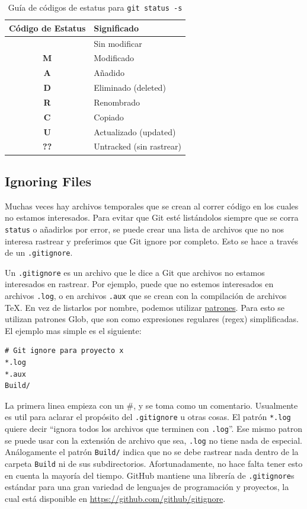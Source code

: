 \documentclass[spanish, 12pt, a4paper]{article}
\begin{document}
\begin{table}[h]
  \centering
  \begin{tabular}{|c|l|}
    \hline
    Código de Estatus & Significado \\
    \hline \hline
      & Sin modificar \\
    \hline
    \textbf{M} & Modificado \\
    \hline
    \textbf{A} & Añadido \\
    \hline
    \textbf{D} & Eliminado (deleted) \\
    \hline
    \textbf{R} & Renombrado \\
    \hline
    \textbf{C} & Copiado \\
    \hline
    \textbf{U} & Actualizado (updated)\\
    \hline
    \textbf{??} & Untracked (sin rastrear) \\
    \hline
  \end{tabular}
  \caption{Guía de códigos de estatus para \texttt{git status -s}}
\end{table}

\subsection{Ignoring Files}
Muchas veces hay archivos temporales que se crean al correr código en los cuales no estamos interesados.
Para evitar que Git esté listándolos siempre que se corra \texttt{status} o añadirlos por error, se puede crear una lista de archivos que no nos interesa rastrear y preferimos que Git ignore por completo.
Esto se hace a través de un \texttt{.gitignore}.

Un \texttt{.gitignore} es un archivo que le dice a Git que archivos no estamos interesados en rastrear.
Por ejemplo, puede que no estemos interesados en archivos \texttt{.log}, o en archivos \texttt{.aux} que se crean con la compilación de archivos \TeX.
En vez de listarlos por nombre, podemos utilizar \underline{patrones}.
Para esto se utilizan patrones Glob, que son como expresiones regulares (regex) simplificadas.
El ejemplo mas simple es el siguiente:
\begin{lstlisting}
# Git ignore para proyecto x
*.log
*.aux
Build/
\end{lstlisting}

La primera linea empieza con un \#, y se toma como un comentario.
Usualmente es util para aclarar el propósito del \texttt{.gitignore} u otras cosas.
El patrón \texttt{*.log} quiere decir ``ignora todos los archivos que terminen con \texttt{.log}''.
Ese mismo patron se puede usar con la extensión de archivo que sea, \texttt{.log} no tiene nada de especial.
Análogamente el patrón \texttt{Build/} indica que no se debe rastrear nada dentro de la carpeta \texttt{Build} ni de sus subdirectorios.
Afortunadamente, no hace falta tener esto en cuenta la mayoría del tiempo.
GitHub mantiene una librería de \texttt{.gitignore}s estándar para una gran variedad de lenguajes de programación y proyectos, la cual está disponible en \url{https://github.com/github/gitignore}.
\end{document}
